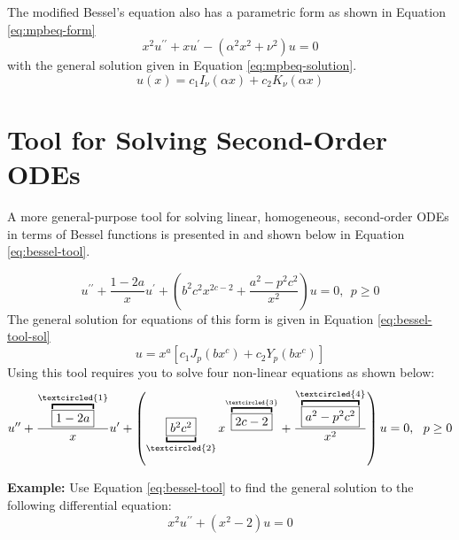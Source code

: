 The modified Bessel's equation also has a parametric form as shown in Equation \ref{eq:mpbeq-form}
\begin{equation}
x^2u^{\prime \prime} + xu^{\prime} - \left(\alpha^2 x^2 + \nu^2 \right)u = 0
\label{eq:mpbeq-form}
\end{equation}
with the general solution given in Equation \ref{eq:mpbeq-solution}.
\begin{equation}
u(x) = c_1I_{\nu}(\alpha x) + c_2 K_{\nu}(\alpha x)
\label{eq:mpbeq-solution}
\end{equation}

\section{Tool for Solving Second-Order ODEs}
A more general-purpose tool for solving linear, homogeneous, second-order ODEs in terms of Bessel functions is presented in \cite{zill2020advanced} and shown below in Equation \ref{eq:bessel-tool}.

\begin{equation}
u^{\prime \prime} + \frac{1-2a}{x}u^{\prime} + \left(b^2 c^2 x^{2c-2} + \frac{a^2-p^2c^2}{x^2} \right)u = 0, \ \ p \ge 0
\label{eq:bessel-tool}
\end{equation}
The general solution for equations of this form is given in Equation \ref{eq:bessel-tool-sol}
\begin{equation}
u = x^a\left[c_1 J_{p}\left(bx^c \right)+c_2Y_{p}\left(bx^c \right) \right]
\label{eq:bessel-tool-sol}
\end{equation}
Using this tool requires you to solve four non-linear equations as shown below:
\begin{equation*}
u^{\prime \prime} + \frac{\overbracket{\fbox{$1-2a$}}^{\textcircled{1}}}{x}u^{\prime} + \left(\underbracket{\fbox{$b^2 c^2$}}_{\textcircled{2}} x^{\overbracket{\fbox{$2c-2$}}^{\textcircled{3}}} + \frac{\overbracket{\fbox{$a^2-p^2c^2$}}^{\textcircled{4}}}{x^2} \right)u = 0, \ \ p \ge 0
\end{equation*}

\vspace{0.5cm}

\noindent\textbf{Example:}  Use Equation \ref{eq:bessel-tool} to find the general solution to the following differential equation:
\begin{equation*}
x^2 u^{\prime \prime} + \left(x^2 - 2\right)u = 0
\end{equation*}

